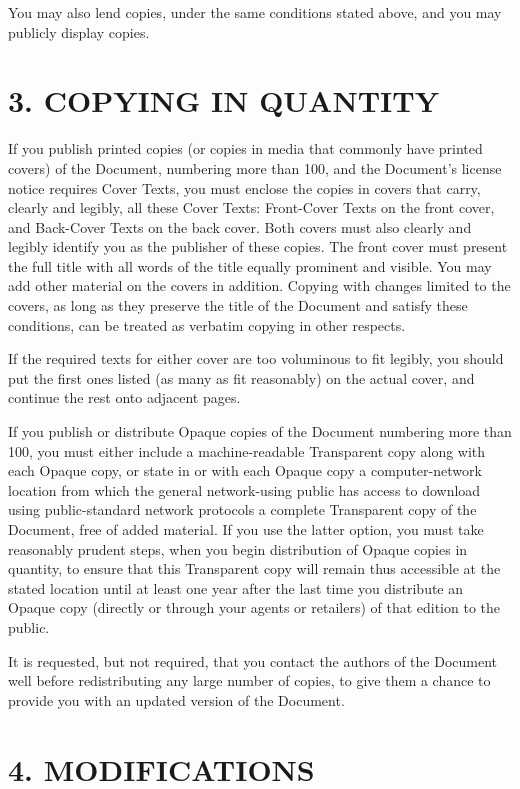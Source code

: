 \documentclass[captions=tableheading]{scrbook}
\begin{document}
You may also lend copies, under the same conditions stated above, and you may publicly display copies.
\section{3. COPYING IN QUANTITY}
\label{sec-18-4}


If you publish printed copies (or copies in media that commonly have printed covers) of the Document, numbering more than 100, and the Document's license notice requires Cover Texts, you must enclose the copies in covers that carry, clearly and legibly, all these Cover Texts: Front-Cover Texts on the front cover, and Back-Cover Texts on the back cover. Both covers must also clearly and legibly identify you as the publisher of these copies. The front cover must present the full title with all words of the title equally prominent and visible. You may add other material on the covers in addition. Copying with changes limited to the covers, as long as they preserve the title of the Document and satisfy these conditions, can be treated as verbatim copying in other respects.

If the required texts for either cover are too voluminous to fit legibly, you should put the first ones listed (as many as fit reasonably) on the actual cover, and continue the rest onto adjacent pages.

If you publish or distribute Opaque copies of the Document numbering more than 100, you must either include a machine-readable Transparent copy along with each Opaque copy, or state in or with each Opaque copy a computer-network location from which the general network-using public has access to download using public-standard network protocols a complete Transparent copy of the Document, free of added material. If you use the latter option, you must take reasonably prudent steps, when you begin distribution of Opaque copies in quantity, to ensure that this Transparent copy will remain thus accessible at the stated location until at least one year after the last time you distribute an Opaque copy (directly or through your agents or retailers) of that edition to the public.

It is requested, but not required, that you contact the authors of the Document well before redistributing any large number of copies, to give them a chance to provide you with an updated version of the Document.
\section{4. MODIFICATIONS}
\label{sec-18-5}
\end{document}
